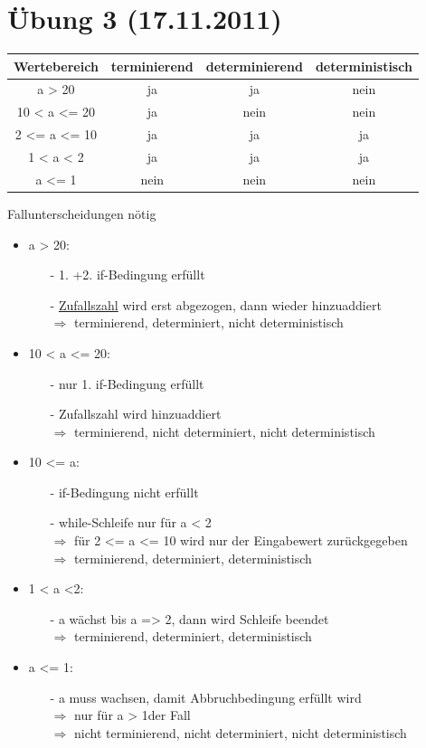 \section{Übung 3 (17.11.2011)}
\begin{table}[h]
\begin{tabular}{c|c|c|c}
Wertebereich & terminierend & determinierend & deterministisch \\
\hline
a > 20 & ja & ja & nein\\
10 < a <= 20 & ja & nein & nein \\
2 <= a <= 10 & ja & ja & ja \\
1 < a < 2 & ja & ja & ja  \\
a <= 1 & nein & nein & nein \\
\end{tabular}
\end{table}
Fallunterscheidungen nötig
\begin{itemize}
\item a > 20:
\begin{itemize}
 \item[-] 1. +2. if-Bedingung erfüllt
 \item[-] \underline{Zufallszahl} wird erst abgezogen, dann wieder hinzuaddiert \\
 $\Rightarrow$ terminierend, determiniert, nicht deterministisch
\end{itemize}
\item 10 < a <= 20:
\begin{itemize}
\item[-] nur 1. if-Bedingung erfüllt
\item[-] Zufallszahl wird hinzuaddiert \\
 $\Rightarrow$ terminierend, nicht determiniert, nicht deterministisch
\end{itemize}
\item 10 <= a:
\begin{itemize}
\item[-] if-Bedingung nicht erfüllt
\item[-] while-Schleife nur für a < 2 \\
 $\Rightarrow$ für 2 <= a <= 10 wird nur der Eingabewert zurückgegeben \\
 $\Rightarrow$ terminierend, determiniert, deterministisch
\end{itemize}
\item 1 < a <2:
\begin{itemize}
 \item[-] a wächst bis a => 2, dann wird Schleife beendet \\
 $\Rightarrow$ terminierend, determiniert, deterministisch
\end{itemize}
\item a <= 1:
\begin{itemize}
 \item[-] a muss wachsen, damit Abbruchbedingung erfüllt wird \\
 $\Rightarrow$ nur für a > 1der Fall \\
  $\Rightarrow$ nicht terminierend, nicht determiniert, nicht deterministisch
\end{itemize}
\end{itemize}

